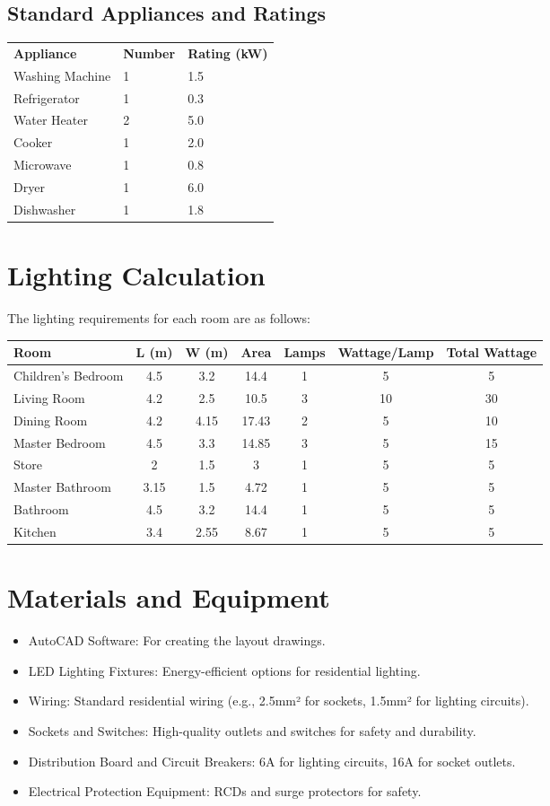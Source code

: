 \documentclass[a4paper,12pt]{article}
\begin{document}
\subsection{Standard Appliances and Ratings}
\begin{tabular}{lll}
    \textbf{Appliance} & \textbf{Number} & \textbf{Rating (kW)} \\
    Washing Machine & 1 & 1.5 \\
    Refrigerator & 1 & 0.3 \\
    Water Heater & 2 & 5.0 \\
    Cooker & 1 & 2.0 \\
    Microwave & 1 & 0.8 \\
    Dryer & 1 & 6.0 \\
    Dishwasher & 1 & 1.8 \\
\end{tabular}

\section{Lighting Calculation}
The lighting requirements for each room are as follows:
\begin{tabular}{|l|c|c|c|c|c|c|}
    \hline
    \textbf{Room} & \textbf{L (m)} & \textbf{W (m)} & \textbf{Area} & \textbf{Lamps} & \textbf{Wattage/Lamp} & \textbf{Total Wattage} \\
    \hline
    Children’s Bedroom & 4.5 & 3.2 & 14.4 & 1 & 5 & 5 \\
    Living Room & 4.2 & 2.5 & 10.5 & 3 & 10 & 30 \\
    Dining Room & 4.2 & 4.15 & 17.43 & 2 & 5 & 10 \\
    Master Bedroom & 4.5 & 3.3 & 14.85 & 3 & 5 & 15 \\
    Store & 2 & 1.5 & 3 & 1 & 5 & 5 \\
    Master Bathroom & 3.15 & 1.5 & 4.72 & 1 & 5 & 5 \\
    Bathroom & 4.5 & 3.2 & 14.4 & 1 & 5 & 5 \\
    Kitchen & 3.4 & 2.55 & 8.67 & 1 & 5 & 5 \\
\end{tabular}

\section{Materials and Equipment}
\begin{itemize}
    \item AutoCAD Software: For creating the layout drawings.
    \item LED Lighting Fixtures: Energy-efficient options for residential lighting.
    \item Wiring: Standard residential wiring (e.g., 2.5mm² for sockets, 1.5mm² for lighting circuits).
    \item Sockets and Switches: High-quality outlets and switches for safety and durability.
    \item Distribution Board and Circuit Breakers: 6A for lighting circuits, 16A for socket outlets.
    \item Electrical Protection Equipment: RCDs and surge protectors for safety.
\end{itemize}
\end{document}
